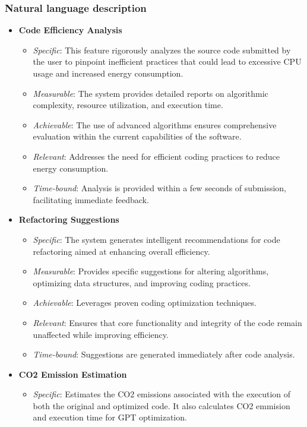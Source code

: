 \documentclass[conference,compsoc]{IEEEtran}
\begin{document}
\subsubsection{Natural language description}
\begin{itemize}
	\item \textbf{Code Efficiency Analysis}
	      \begin{itemize}
		      \item \textit{Specific}: This feature rigorously analyzes the source code submitted by the user to pinpoint inefficient practices that could lead to excessive CPU usage and increased energy consumption.
		      \item \textit{Measurable}: The system provides detailed reports on algorithmic complexity, resource utilization, and execution time.
		      \item \textit{Achievable}: The use of advanced algorithms ensures comprehensive evaluation within the current capabilities of the software.
		      \item \textit{Relevant}: Addresses the need for efficient coding practices to reduce energy consumption.
		      \item \textit{Time-bound}: Analysis is provided within a few seconds of submission, facilitating immediate feedback.
	      \end{itemize}
	\item \textbf{Refactoring Suggestions}
	      \begin{itemize}
		      \item \textit{Specific}: The system generates intelligent recommendations for code refactoring aimed at enhancing overall efficiency.
		      \item \textit{Measurable}: Provides specific suggestions for altering algorithms, optimizing data structures, and improving coding practices.
		      \item \textit{Achievable}: Leverages proven coding optimization techniques.
		      \item \textit{Relevant}: Ensures that core functionality and integrity of the code remain unaffected while improving efficiency.
		      \item \textit{Time-bound}: Suggestions are generated immediately after code analysis.
	      \end{itemize}
	\item \textbf{CO2 Emission Estimation}
	      \begin{itemize}
		      \item \textit{Specific}: Estimates the CO2 emissions associated with the execution of both the original and optimized code. It also calculates CO2 emmision and execution time for GPT optimization.

\end{itemize}
\end{itemize}
\end{document}
